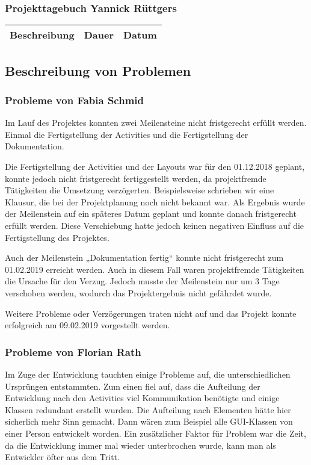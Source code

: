 \newpage
\subsubsection{Projekttagebuch Yannick Rüttgers}
\begin{longtable}{|p{10cm}|p{2cm}|p{2cm}|}
\hline
{\textbf{Beschreibung}} & {\textbf{Dauer}} & {\textbf{Datum}} \\ \hline

\end{longtable}

\newpage
\subsection{Beschreibung von Problemen}

\subsubsection{Probleme von Fabia Schmid}
Im Lauf des Projektes konnten zwei Meilensteine nicht fristgerecht erfüllt werden. Einmal die Fertigstellung der Activities und die Fertigstellung der Dokumentation.
 
Die Fertigstellung der Activities und der Layouts war für den 01.12.2018 geplant, konnte jedoch nicht fristgerecht fertiggestellt werden, da projektfremde Tätigkeiten die Umsetzung verzögerten. Beispielsweise schrieben wir eine Klausur, die bei der Projektplanung noch nicht bekannt war. Als Ergebnis wurde der Meilenstein auf ein späteres Datum geplant und konnte danach fristgerecht erfüllt werden. Diese Verschiebung hatte jedoch keinen negativen Einfluss auf die Fertigstellung des Projektes.

Auch der Meilenstein „Dokumentation fertig“ konnte nicht fristgerecht zum 01.02.2019 erreicht werden. Auch in diesem Fall waren projektfremde Tätigkeiten die Ursache für den Verzug. Jedoch musste der Meilenstein nur um 3 Tage verschoben werden, wodurch das Projektergebnis nicht gefährdet wurde.

Weitere Probleme oder Verzögerungen traten nicht auf und das Projekt konnte erfolgreich am 09.02.2019 vorgestellt werden.

\subsubsection{Probleme von Florian Rath}
Im Zuge der Entwicklung tauchten einige Probleme auf, die unterschiedlichen Ursprüngen entstammten. Zum einen fiel auf, dass die Aufteilung der Entwicklung nach den Activities viel Kommunikation benötigte und einige Klassen redundant erstellt wurden. Die Aufteilung nach Elementen hätte hier sicherlich mehr Sinn gemacht. Dann wären zum Beispiel alle GUI-Klassen von einer Person entwickelt worden. Ein zusätzlicher Faktor für Problem war die Zeit, da die Entwicklung immer mal wieder unterbrochen wurde, kann man als Entwickler öfter aus dem Tritt.

